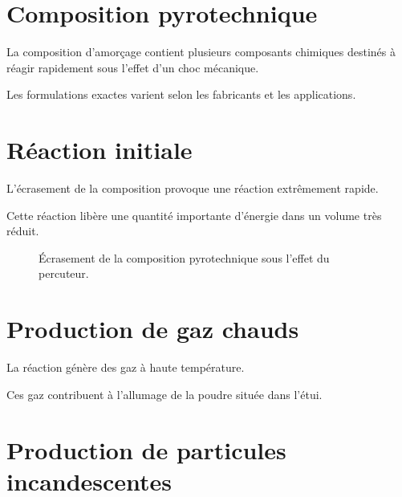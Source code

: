 \section{Composition pyrotechnique}

La composition d'amorçage contient plusieurs composants chimiques destinés à
réagir rapidement sous l'effet d'un choc mécanique.

Les formulations exactes varient selon les fabricants et les applications.

\section{Réaction initiale}

L'écrasement de la composition provoque une réaction extrêmement rapide.

Cette réaction libère une quantité importante d'énergie dans un volume très
réduit.

\begin{figure}[htbp]
\centering


\caption{Écrasement de la composition pyrotechnique sous l'effet du percuteur.}
\label{fig:ecrasement_composition}

\end{figure}

\section{Production de gaz chauds}

La réaction génère des gaz à haute température.

Ces gaz contribuent à l'allumage de la poudre située dans l'étui.

\section{Production de particules incandescentes}

